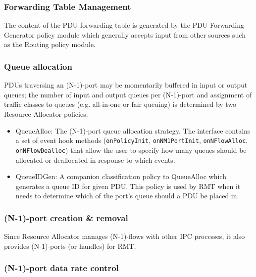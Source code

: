             \subsubsection{Forwarding Table Management}

                The content of the PDU forwarding table is generated by the PDU Forwarding Generator policy module which generally accepts input from other sources such as the Routing policy module.

            \subsubsection{Queue allocation}

                PDUs traversing an (N-1)-port may be momentarily buffered in input or output queues; the number of input and output queues per (N-1)-port and assignment of traffic classes to queues (e.g. all-in-one or fair queuing)
                is determined by two Resource Allocator policies.

                \begin{itemize}
                    \item QueueAlloc: The (N-1)-port queue allocation strategy. The interface contains a set of event hook methods (\texttt{onPolicyInit}, \texttt{onNM1PortInit}, \texttt{onNFlowAlloc}, \texttt{onNFlowDealloc}) that allow the user to specify how many queues should be allocated or deallocated in response to which events.
                    \item QueueIDGen: A companion classification policy to QueueAlloc which generates a queue ID for given PDU. This policy is used by RMT when it needs to determine which of the port's queue should a PDU be placed in.
                \end{itemize}

            \subsubsection{(N-1)-port creation \& removal}

                Since Resource Allocator manages (N-1)-flows with other IPC processes, it also provides (N-1)-ports (or handles) for RMT.

            \subsubsection{(N-1)-port data rate control}

